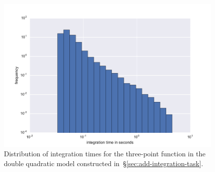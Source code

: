 \documentclass[11pt,a4paper]{article}
\begin{document}
\begin{figure}
    \begin{center}
        \includegraphics[scale=0.65]{Outputs/timing_histogram}    
    \end{center}
    \caption{\label{fig:time-distribution}Distribution of integration
    times for the three-point function in the double quadratic model
    constructed in~\S\ref{sec:add-integration-task}.}
\end{figure}
\end{document}

